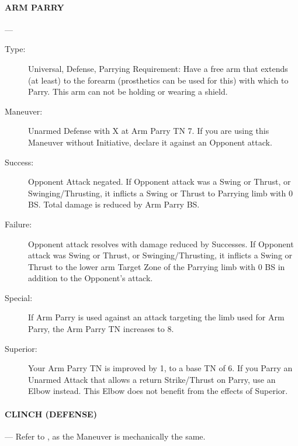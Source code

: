 \documentclass[oneside,11pt,english]{book}
\begin{document}
\paragraph{\large\label{man:ARM PARRY} ARM PARRY}---\quad{\large[X]}
\vspace{-10pt}\begin{description} 
\item [Type:] Universal, Defense, Parrying 
Requirement: Have a free arm that extends (at least) to the forearm (prosthetics can be used for this) with 
which to Parry. This arm can not be holding or wearing a shield. 
\item [Maneuver:] Unarmed Defense with X at Arm Parry TN 7. If you are using this Maneuver without 
Initiative, declare it against an Opponent attack. 
\item [Success:] Opponent Attack negated. If Opponent attack was a Swing or Thrust, or Swinging/Thrusting, it 
inflicts a Swing or Thrust to Parrying limb with 0 BS. Total damage is reduced by Arm Parry BS. 
\item [Failure:] Opponent attack resolves with damage reduced by Successes. If Opponent attack was Swing or 
Thrust, or Swinging/Thrusting, it inflicts a Swing or Thrust to the lower arm Target Zone of the Parrying 
limb with 0 BS in addition to the Opponent’s attack. 
\item [Special:] If Arm Parry is used against an attack targeting the limb used for Arm Parry, the Arm Parry TN 
increases to 8. 
\item [Superior:] Your Arm Parry TN is improved by 1, to a base TN of 6. If you Parry an Unarmed Attack that 
allows a return Strike/Thrust on Parry, use an Elbow instead. This Elbow does not benefit from the effects 
of Superior. 
\end{description}

\paragraph{\large\label{man:CLINCH (DEFENSE)} CLINCH (DEFENSE)}---\quad{\large[??????]}
Refer to , as the Maneuver is mechanically the same.
\end{document}
